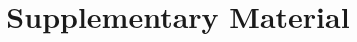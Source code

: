 \documentclass[12pt,a4paper]{article}
\begin{document}
\title{Supplementary Material}
\maketitle
\tableofcontents
\newpage

\end{document}
